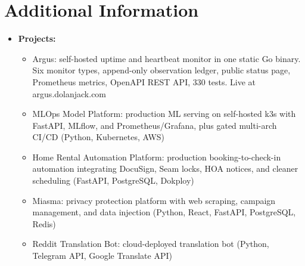 \documentclass[10pt]{extarticle}
\begin{document}
\section{Additional Information}
\begin{itemize}
    \itemsep0.1em
    \item \textbf{Projects: }
    \vspace{-\topsep} \vspace{0.2em}
    \begin{itemize}
        \itemsep0em
        \item Argus: self-hosted uptime and heartbeat monitor in one static Go binary. Six monitor types, append-only observation ledger, public status page, Prometheus metrics, OpenAPI REST API, 330 tests. Live at argus.dolanjack.com
        \item MLOps Model Platform: production ML serving on self-hosted k3s with FastAPI, MLflow, and Prometheus/Grafana, plus gated multi-arch CI/CD (Python, Kubernetes, AWS)
        \item Home Rental Automation Platform: production booking-to-check-in automation integrating DocuSign, Seam locks, HOA notices, and cleaner scheduling (FastAPI, PostgreSQL, Dokploy)
        \item Miasma: privacy protection platform with web scraping, campaign management, and data injection (Python, React, FastAPI, PostgreSQL, Redis)
        \item Reddit Translation Bot: cloud-deployed translation bot (Python, Telegram API, Google Translate API)
    \end{itemize} \end{itemize}

\end{document}
